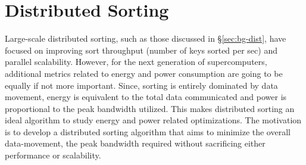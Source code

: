 \section{Distributed Sorting}
\label{sec:dsort}

Large-scale distributed sorting, such as those discussed in \S\ref{sec:bg-dist}, have focused on improving sort throughput (number of keys sorted per sec) and parallel scalability. However, for the next generation of supercomputers, additional metrics related to energy and power consumption are going to be equally if not more important. Since, sorting is entirely dominated by data movement, energy is equivalent to the total data communicated and power is proportional to the peak bandwidth utilized. This makes distributed sorting an ideal algorithm to study energy and power related optimizations. The motivation is to develop a distributed sorting algorithm that aims to minimize the overall data-movement, the peak bandwidth required without sacrificing either performance or scalability. 
